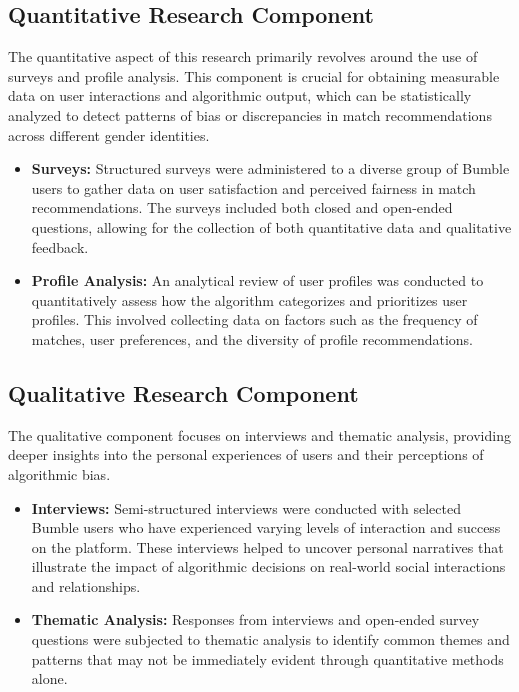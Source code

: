 \subsection{Quantitative Research Component}
The quantitative aspect of this research primarily revolves around the use of surveys and profile analysis. This component is crucial for obtaining measurable data on user interactions and algorithmic output, which can be statistically analyzed to detect patterns of bias or discrepancies in match recommendations across different gender identities.

\begin{itemize}
    \item \textbf{Surveys:} Structured surveys were administered to a diverse group of Bumble users to gather data on user satisfaction and perceived fairness in match recommendations. The surveys included both closed and open-ended questions, allowing for the collection of both quantitative data and qualitative feedback.
    \item \textbf{Profile Analysis:} An analytical review of user profiles was conducted to quantitatively assess how the algorithm categorizes and prioritizes user profiles. This involved collecting data on factors such as the frequency of matches, user preferences, and the diversity of profile recommendations. 
\end{itemize}

\subsection{Qualitative Research Component}
The qualitative component focuses on interviews and thematic analysis, providing deeper insights into the personal experiences of users and their perceptions of algorithmic bias.

\begin{itemize}
    \item \textbf{Interviews:} Semi-structured interviews were conducted with selected Bumble users who have experienced varying levels of interaction and success on the platform. These interviews helped to uncover personal narratives that illustrate the impact of algorithmic decisions on real-world social interactions and relationships.
    \item \textbf{Thematic Analysis:} Responses from interviews and open-ended survey questions were subjected to thematic analysis to identify common themes and patterns that may not be immediately evident through quantitative methods alone.
\end{itemize}

